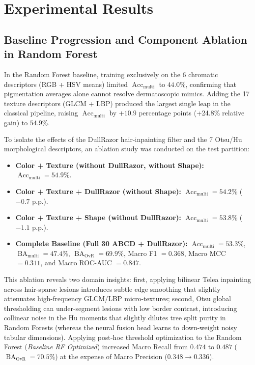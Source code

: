 \documentclass[11pt,a4paper]{article}
\begin{document}
\section{Experimental Results}

\subsection{Baseline Progression and Component Ablation in Random Forest}
In the Random Forest baseline, training exclusively on the 6 chromatic descriptors (RGB + HSV means) limited $\operatorname{Acc}_{\text{multi}}$ to $44.0\%$, confirming that pigmentation averages alone cannot resolve dermatoscopic mimics. Adding the 17 texture descriptors (GLCM + LBP) produced the largest single leap in the classical pipeline, raising $\operatorname{Acc}_{\text{multi}}$ by $+10.9$ percentage points (+24.8\% relative gain) to $54.9\%$.

To isolate the effects of the DullRazor hair-inpainting filter and the 7 Otsu/Hu morphological descriptors, an ablation study was conducted on the test partition:
\begin{itemize}
    \item \textbf{Color + Texture (without DullRazor, without Shape):} $\operatorname{Acc}_{\text{multi}} = 54.9\%$.
    \item \textbf{Color + Texture + DullRazor (without Shape):} $\operatorname{Acc}_{\text{multi}} = 54.2\%$ ($-0.7$ p.p.).
    \item \textbf{Color + Texture + Shape (without DullRazor):} $\operatorname{Acc}_{\text{multi}} = 53.8\%$ ($-1.1$ p.p.).
    \item \textbf{Complete Baseline (Full 30 ABCD + DullRazor):} $\operatorname{Acc}_{\text{multi}} = 53.3\%$, $\operatorname{BA}_{\text{multi}} = 47.4\%$, $\overline{\operatorname{BA}}_{\text{OvR}} = 69.9\%$, Macro F1 $= 0.368$, Macro MCC $= 0.311$, and Macro ROC-AUC $= 0.847$.
\end{itemize}
This ablation reveals two domain insights: first, applying bilinear Telea inpainting across hair-sparse lesions introduces subtle edge smoothing that slightly attenuates high-frequency GLCM/LBP micro-textures; second, Otsu global thresholding can under-segment lesions with low border contrast, introducing collinear noise in the Hu moments that slightly dilutes tree split purity in Random Forests (whereas the neural fusion head learns to down-weight noisy tabular dimensions). Applying post-hoc threshold optimization to the Random Forest (\textit{Baseline RF Optimized}) increased Macro Recall from $0.474$ to $0.487$ ($\overline{\operatorname{BA}}_{\text{OvR}} = 70.5\%$) at the expense of Macro Precision ($0.348 \to 0.336$).
\end{document}
